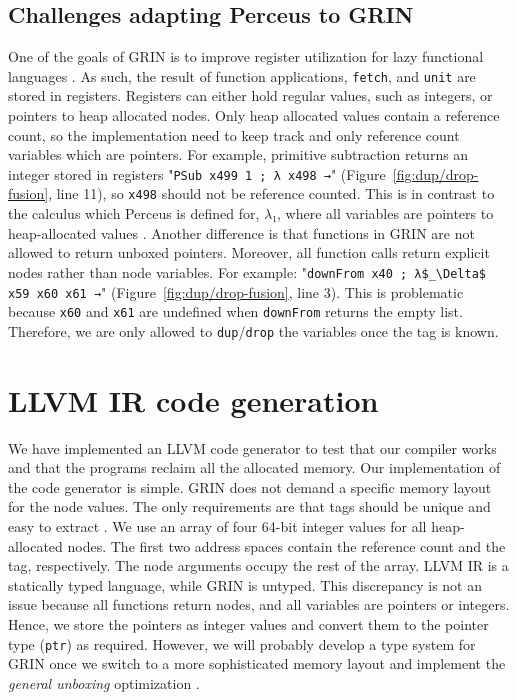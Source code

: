 \documentclass[9pt, twocolumn]{article}
\begin{document}
\subsection{Challenges adapting Perceus to GRIN}
\label{sec:perceus-challanges}
One of the goals of GRIN is to improve register utilization for lazy functional languages \mbox{\citep{boquist1999}}.
As such, the result of function applications, \lstinline{fetch}, and \lstinline{unit} are stored in registers.
Registers can either hold regular values, such as integers, or pointers to heap allocated nodes.
Only heap allocated values contain a reference count, so the implementation need to keep track and only reference count variables which are pointers. 
For example, primitive subtraction returns an integer stored in registers "\lstinline{PSub x499 1 ; λ x498 →}" \mbox{(Figure \ref{fig:dup/drop-fusion}}, line 11), so \lstinline{x498} should not be reference counted.
This is in contrast to the calc\-ulus which Perceus is defined for, $λ₁$, where all variables are pointers to heap-allocated values \citep{reinking2021}.
Another difference is that functions in GRIN are not allowed to return unboxed pointers. 
Moreover, all function calls ret\-urn explicit nodes rather than node variables. 
For example: "\lstinline{downFrom x40 ; λ$_\Delta$ x59 x60 x61 →}" (\mbox{Figure \ref{fig:dup/drop-fusion}}, line 3).
This is problematic because \lstinline{x60} and \lstinline{x61} are undefined when \lstinline{downFrom} returns the empty list.
Therefore, we are only allowed to \lstinline{dup}/\lstinline{drop} the variables once the tag is known.

\section{LLVM IR code generation}
\label{sec:llvm-codegen}
We have implemented an LLVM code generator to test that our compiler works and that the programs reclaim all the allocated memory. 
Our implementation of the code generator is simple. 
GRIN does not demand a specific memory layout for the node values.
The only requirements are that tags should be unique and easy to extract \citep{boquist1999}.
We use an array of four 64-bit integer values for all heap-allocated nodes. 
The first two address spaces contain the reference count and the tag, respectively.
The node arguments occupy the rest of the array.
LLVM IR is a statically typed language, while GRIN is untyped.
This discrepancy is not an issue because all functions return nodes, and all variables are pointers or integers.
Hence, we store the pointers as integer values and convert them to the pointer type (\lstinline{ptr}) as required.
However, we will probably develop a type system for GRIN once we switch to a more sophisticated memory layout and implement the \emph{general unboxing} optimization \citep{boquist1999}.
\end{document}
